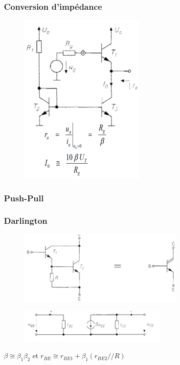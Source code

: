 \documentclass[resume]{subfiles}
\begin{document}
\begin{multicols}{3}
\subsubsection{Conversion d'impédance}
\begin{figure}[H]
    \centering
    \includegraphics[width=0.5\columnwidth]{../images/OpAmp1/m_convImp.png}
\end{figure}

\subsubsection{Push-Pull}

\subsubsection{Darlington}
\begin{figure}[H]
    \centering
    \includegraphics[width=0.8\columnwidth]{../images/OpAmp1/m_darlington.png}
\end{figure}
\begin{figure}[H]
    \centering
    \includegraphics[width=0.8\columnwidth]{../images/OpAmp1/mPS_darlington.png}
\end{figure}
$\beta \cong \beta_1\beta_2 $ et $r_{BE} \cong r_{BE1} + \beta_1(r_{BE2}//R)$


\end{multicols}
\end{document}
